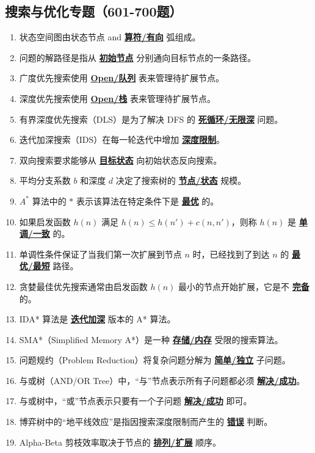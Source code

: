 \documentclass[12pt,a4paper,openany]{ctexbook}
\begin{document}
\subsection{搜索与优化专题（601-700题）}
\begin{enumerate}[resume,leftmargin=2em,itemsep=1pt]
\item 状态空间图由状态节点 and \underline{\textbf{算符/有向}} 弧组成。
\item 问题的解路径是指从 \underline{\textbf{初始节点}} 分别通向目标节点的一条路径。
\item 广度优先搜索使用 \underline{\textbf{Open/队列}} 表来管理待扩展节点。
\item 深度优先搜索使用 \underline{\textbf{Open/栈}} 表来管理待扩展节点。
\item 有界深度优先搜索（DLS）是为了解决 DFS 的 \underline{\textbf{死循环/无限深}} 问题。
\item 迭代加深搜索（IDS）在每一轮迭代中增加 \underline{\textbf{深度限制}}。
\item 双向搜索要求能够从 \underline{\textbf{目标状态}} 向初始状态反向搜索。
\item 平均分支系数 $b$ 和深度 $d$ 决定了搜索树的 \underline{\textbf{节点/状态}} 规模。
\item $A^*$ 算法中的 $*$ 表示该算法在特定条件下是 \underline{\textbf{最优}} 的。
\item 如果启发函数 $h(n)$ 满足 $h(n) \le h(n') + c(n, n')$，则称 $h(n)$ 是 \underline{\textbf{单调/一致}} 的。
\item 单调性条件保证了当我们第一次扩展到节点 $n$ 时，已经找到了到达 $n$ 的 \underline{\textbf{最优/最短}} 路径。
\item 贪婪最佳优先搜索通常由启发函数 $h(n)$ 最小的节点开始扩展，它是不 \underline{\textbf{完备}} 的。
\item IDA* 算法是 \underline{\textbf{迭代加深}} 版本的 A* 算法。
\item SMA*（Simplified Memory A*）是一种 \underline{\textbf{存储/内存}} 受限的搜索算法。
\item 问题规约（Problem Reduction）将复杂问题分解为 \underline{\textbf{简单/独立}} 子问题。
\item 与或树（AND/OR Tree）中，“与”节点表示所有子问题都必须 \underline{\textbf{解决/成功}}。
\item 与或树中，“或”节点表示只要有一个子问题 \underline{\textbf{解决/成功}} 即可。
\item 博弈树中的“地平线效应”是指因搜索深度限制而产生的 \underline{\textbf{错误}} 判断。
\item Alpha-Beta 剪枝效率取决于节点的 \underline{\textbf{排列/扩展}} 顺序。

\end{enumerate}
\end{document}

